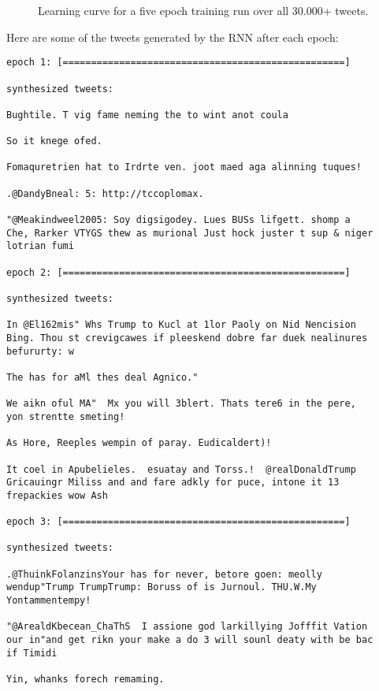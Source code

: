 \documentclass{article}
\begin{document}
\begin{figure}[H]
  \centering
    
    \caption{Learning curve for a five epoch training run over all 30.000+
             tweets.}
\label{fig:learning_curve}
\end{figure}

\noindent
Here are some of the tweets generated by the RNN after each epoch:

\begin{verbatim}
epoch 1: [==================================================]

synthesized tweets:

Bughtile. T vig fame neming the to wint anot coula

So it knege ofed.

Fomaquretrien hat to Irdrte ven. joot maed aga alinning tuques!

.@DandyBneal: 5: http://tccoplomax.

"@Meakindweel2005: Soy digsigodey. Lues BUSs lifgett. shomp a
Che, Rarker VTYGS thew as murional Just hock juster t sup & niger
lotrian fumi

epoch 2: [==================================================]

synthesized tweets:

In @El162mis" Whs Trump to Kucl at 1lor Paoly on Nid Nencision
Bing. Thou st crevigcawes if pleeskend dobre far duek nealinures
befururty: w

The has for aMl thes deal Agnico."

We aikn oful MA"  Mx you will 3blert. Thats tere6 in the pere,
yon strentte smeting!

As Hore, Reeples wempin of paray. Eudicaldert)!

It coel in Apubelieles.  esuatay and Torss.!  @realDonaldTrump
Gricauingr Miliss and and fare adkly for puce, intone it 13
frepackies wow Ash

epoch 3: [==================================================]

synthesized tweets:

.@ThuinkFolanzinsYour has for never, betore goen: meolly
wendup"Trump TrumpTrump: Boruss of is Jurnoul. THU.W.My
Yontammentempy!

"@ArealdKbecean_ChaThS  I assione god larkillying Jofffit Vation
our in"and get rikn your make a do 3 will sounl deaty with be bac
if Timidi

Yin, whanks forech remaming.


\end{verbatim}
\end{document}

